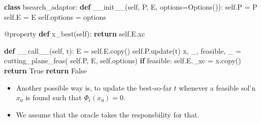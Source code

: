 \documentclass[10pt,ignorenonframetext,serif,onlymath]{beamer}
\newenvironment{Shaded}{}{}
\newcommand{\AttributeTok}[1]{\textcolor[rgb]{0.49,0.56,0.16}{#1}}
\newcommand{\ControlFlowTok}[1]{\textcolor[rgb]{0.00,0.44,0.13}{\textbf{#1}}}
\newcommand{\FunctionTok}[1]{\textcolor[rgb]{0.02,0.16,0.49}{#1}}
\newcommand{\KeywordTok}[1]{\textcolor[rgb]{0.00,0.44,0.13}{\textbf{#1}}}
\newcommand{\NormalTok}[1]{#1}
\newcommand{\OperatorTok}[1]{\textcolor[rgb]{0.40,0.40,0.40}{#1}}
\newcommand{\VariableTok}[1]{\textcolor[rgb]{0.10,0.09,0.49}{#1}}
\providecommand{\tightlist}{%
  \setlength{\itemsep}{0pt}\setlength{\parskip}{0pt}}
\begin{document}
\begin{frame}[fragile]

\begin{Shaded}
\begin{Highlighting}[]
\KeywordTok{class}\NormalTok{ bsearch_adaptor:}
    \KeywordTok{def} \FunctionTok{__init__}\NormalTok{(}\VariableTok{self}\NormalTok{, P, E, options}\OperatorTok{=}\NormalTok{Options()):}
        \VariableTok{self}\NormalTok{.P }\OperatorTok{=}\NormalTok{ P}
        \VariableTok{self}\NormalTok{.E }\OperatorTok{=}\NormalTok{ E}
        \VariableTok{self}\NormalTok{.options }\OperatorTok{=}\NormalTok{ options}

    \AttributeTok{@property}
    \KeywordTok{def}\NormalTok{ x_best(}\VariableTok{self}\NormalTok{):}
        \ControlFlowTok{return} \VariableTok{self}\NormalTok{.E.xc}

    \KeywordTok{def} \FunctionTok{__call__}\NormalTok{(}\VariableTok{self}\NormalTok{, t):}
\NormalTok{        E }\OperatorTok{=} \VariableTok{self}\NormalTok{.E.copy()}
        \VariableTok{self}\NormalTok{.P.update(t)}
\NormalTok{        x, _, feasible, _ }\OperatorTok{=}\NormalTok{ cutting_plane_feas(}
            \VariableTok{self}\NormalTok{.P, E, }\VariableTok{self}\NormalTok{.options)}
        \ControlFlowTok{if}\NormalTok{ feasible:}
            \VariableTok{self}\NormalTok{.E._xc }\OperatorTok{=}\NormalTok{ x.copy()}
            \ControlFlowTok{return} \VariableTok{True}
        \ControlFlowTok{return} \VariableTok{False}
\end{Highlighting}
\end{Shaded}

\end{frame}

\begin{frame}

\begin{itemize}
\tightlist
\item
  Another possible way is, to update the best-so-far \(t\) whenever a
  feasible sol’n \(x_0\) is found such that \(\Phi_t(x_0) = 0\).
\item
  We assume that the oracle takes the responsbility for that.
\end{itemize}

\end{frame}
\end{document}
